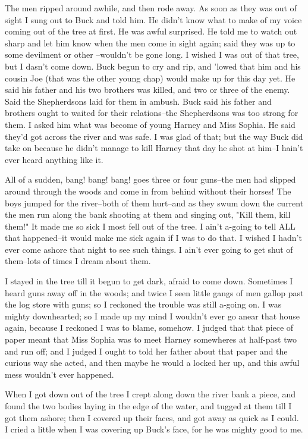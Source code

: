 The men ripped around awhile, and then rode away.  As soon as they was
out of sight I sung out to Buck and told him.  He didn't know what to
make of my voice coming out of the tree at first.  He was awful
surprised.  He told me to watch out sharp and let him know when the men
come in sight again; said they was up to some devilment or other
--wouldn't be gone long.  I wished I was out of that tree, but I dasn't
come down.  Buck begun to cry and rip, and 'lowed that him and his cousin
Joe (that was the other young chap) would make up for this day yet.  He
said his father and his two brothers was killed, and two or three of the
enemy.  Said the Shepherdsons laid for them in ambush.  Buck said his
father and brothers ought to waited for their relations--the Shepherdsons
was too strong for them.  I asked him what was become of young Harney and
Miss Sophia.  He said they'd got across the river and was safe.  I was
glad of that; but the way Buck did take on because he didn't manage to
kill Harney that day he shot at him--I hain't ever heard anything like
it.

All of a sudden, bang! bang! bang! goes three or four guns--the men had
slipped around through the woods and come in from behind without their
horses!  The boys jumped for the river--both of them hurt--and as they
swum down the current the men run along the bank shooting at them and
singing out, "Kill them, kill them!"  It made me so sick I most fell out
of the tree.  I ain't a-going to tell ALL that happened--it would make me
sick again if I was to do that.  I wished I hadn't ever come ashore that
night to see such things.  I ain't ever going to get shut of them--lots
of times I dream about them.

I stayed in the tree till it begun to get dark, afraid to come down.
Sometimes I heard guns away off in the woods; and twice I seen little
gangs of men gallop past the log store with guns; so I reckoned the
trouble was still a-going on.  I was mighty downhearted; so I made up my
mind I wouldn't ever go anear that house again, because I reckoned I was
to blame, somehow. I judged that that piece of paper meant that Miss
Sophia was to meet Harney somewheres at half-past two and run off; and I
judged I ought to told her father about that paper and the curious way
she acted, and then maybe he would a locked her up, and this awful mess
wouldn't ever happened.

When I got down out of the tree I crept along down the river bank a
piece, and found the two bodies laying in the edge of the water, and
tugged at them till I got them ashore; then I covered up their faces, and
got away as quick as I could.  I cried a little when I was covering up
Buck's face, for he was mighty good to me.

